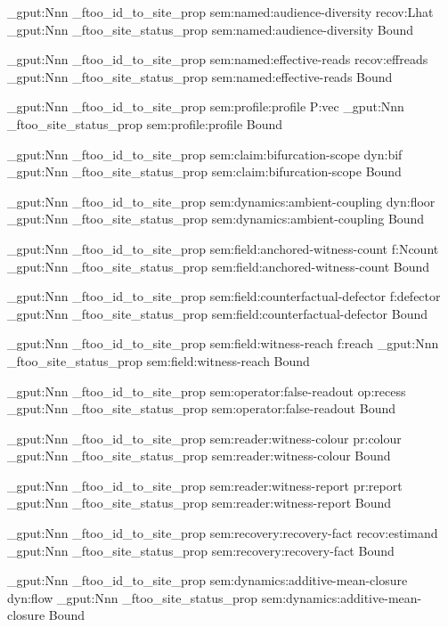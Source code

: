 \prop_gput:Nnn \g_ftoo_id_to_site_prop { sem:named:audience-diversity } { recov:Lhat }
\prop_gput:Nnn \g_ftoo_site_status_prop { sem:named:audience-diversity } { Bound }

\prop_gput:Nnn \g_ftoo_id_to_site_prop { sem:named:effective-reads } { recov:effreads }
\prop_gput:Nnn \g_ftoo_site_status_prop { sem:named:effective-reads } { Bound }

\prop_gput:Nnn \g_ftoo_id_to_site_prop { sem:profile:profile } { P:vec }
\prop_gput:Nnn \g_ftoo_site_status_prop { sem:profile:profile } { Bound }

\prop_gput:Nnn \g_ftoo_id_to_site_prop { sem:claim:bifurcation-scope } { dyn:bif }
\prop_gput:Nnn \g_ftoo_site_status_prop { sem:claim:bifurcation-scope } { Bound }

\prop_gput:Nnn \g_ftoo_id_to_site_prop { sem:dynamics:ambient-coupling } { dyn:floor }
\prop_gput:Nnn \g_ftoo_site_status_prop { sem:dynamics:ambient-coupling } { Bound }

\prop_gput:Nnn \g_ftoo_id_to_site_prop { sem:field:anchored-witness-count } { f:Ncount }
\prop_gput:Nnn \g_ftoo_site_status_prop { sem:field:anchored-witness-count } { Bound }

\prop_gput:Nnn \g_ftoo_id_to_site_prop { sem:field:counterfactual-defector } { f:defector }
\prop_gput:Nnn \g_ftoo_site_status_prop { sem:field:counterfactual-defector } { Bound }

\prop_gput:Nnn \g_ftoo_id_to_site_prop { sem:field:witness-reach } { f:reach }
\prop_gput:Nnn \g_ftoo_site_status_prop { sem:field:witness-reach } { Bound }

\prop_gput:Nnn \g_ftoo_id_to_site_prop { sem:operator:false-readout } { op:recess }
\prop_gput:Nnn \g_ftoo_site_status_prop { sem:operator:false-readout } { Bound }

\prop_gput:Nnn \g_ftoo_id_to_site_prop { sem:reader:witness-colour } { pr:colour }
\prop_gput:Nnn \g_ftoo_site_status_prop { sem:reader:witness-colour } { Bound }

\prop_gput:Nnn \g_ftoo_id_to_site_prop { sem:reader:witness-report } { pr:report }
\prop_gput:Nnn \g_ftoo_site_status_prop { sem:reader:witness-report } { Bound }

\prop_gput:Nnn \g_ftoo_id_to_site_prop { sem:recovery:recovery-fact } { recov:estimand }
\prop_gput:Nnn \g_ftoo_site_status_prop { sem:recovery:recovery-fact } { Bound }

\prop_gput:Nnn \g_ftoo_id_to_site_prop { sem:dynamics:additive-mean-closure } { dyn:flow }
\prop_gput:Nnn \g_ftoo_site_status_prop { sem:dynamics:additive-mean-closure } { Bound }

